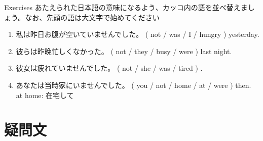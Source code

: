 \documentclass[aspectratio=169,xcolor={dvipsnames,table}]{beamer}
\newcommand{\myaudio}[1]{\href{#1}{\faVolumeUp}}
\begin{document}
\begin{frame}[plain]{Exercises}
あたえられた日本語の意味になるよう、カッコ内の語を並べ替えましょう。なお、先頭の語は大文字で始めてください

\begin{enumerate}
 \item 私は昨日お腹が空いていませんでした。
( not / was / I / hungry ) yesterday.\\
 \item 
彼らは昨晩忙しくなかった。
( not / they / busy / were ) last night.\\
 \item 
彼女は疲れていませんでした。
( not / she / was / tired ) .\\
 \item 
あなたは当時家にいませんでした。
( you / not / home / at / were ) then.\\
\hfill{\scriptsize at home: 在宅して}
\end{enumerate}

\hfill{\scriptsize \myaudio{./audio/024_past_be_05.mp3}}

\end{frame}


\section{疑問文}
\end{document}
